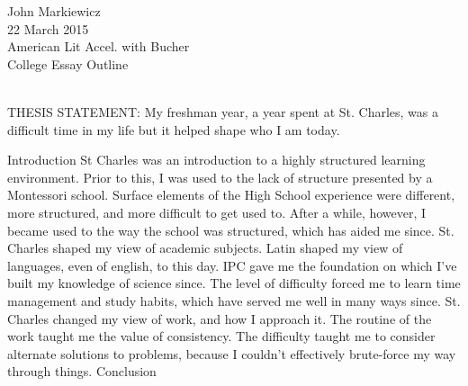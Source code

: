 \documentclass[12pt]{article}
\begin{document}
\begin{raggedleft}
	John Markiewicz \\
	22 March 2015 \\
	American Lit Accel. with Bucher \\
	College Essay Outline \\
\end{raggedleft}
\noindent
\\ THESIS STATEMENT: My freshman year, a year spent at St.
	Charles, was a difficult time in my life but it helped shape
	who I am today.
\begin{outline}[enumerate]
	\1 Introduction
	\1 St Charles was an introduction to a highly structured 
		learning environment.
		\2 Prior to this, I was used to the lack of structure 
			presented by a Montessori school.
		\2 Surface elements of the High School experience were
			different, more structured, and more difficult to get
			used to.
		\2 After a while, however, I became used to the way the
			school was structured, which has aided me since.
	\1 St. Charles shaped my view of academic subjects.
		\2 Latin shaped my view of languages, even of english,
			to this day.
		\2 IPC gave me the foundation on which I've built my 
			knowledge of science since.
		\2 The level of difficulty forced me to learn time management
			and study habits, which have served me well in many ways
			since.
	\1 St. Charles changed my view of work, and how I approach
		it.
		\2 The routine  of the work taught me the value of 
			consistency.
		\2 The difficulty taught me to consider alternate solutions
			to problems, because I couldn't effectively brute-force my 
			way through things.
	\1 Conclusion
\end{outline}
\end{document}
